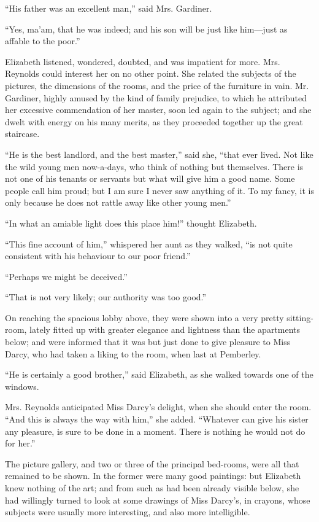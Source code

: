 ``His father was an excellent man,'' said Mrs. Gardiner.

``Yes, ma'am, that he was indeed; and his son will be just like him---just as affable to the poor.''

Elizabeth listened, wondered, doubted, and was impatient for more. Mrs. Reynolds could interest her on no other point. She related the subjects of the pictures, the dimensions of the rooms, and the price of the furniture in vain. Mr. Gardiner, highly amused by the kind of family prejudice, to which he attributed her excessive commendation of her master, soon led again to the subject; and she dwelt with energy on his many merits, as they proceeded together up the great staircase.

``He is the best landlord, and the best master,'' said she, ``that ever lived. Not like the wild young men now-a-days, who think of nothing but themselves. There is not one of his tenants or servants but what will give him a good name. Some people call him proud; but I am sure I never saw anything of it. To my fancy, it is only because he does not rattle away like other young men.''

``In what an amiable light does this place him!'' thought Elizabeth.

``This fine account of him,'' whispered her aunt as they walked, ``is not quite consistent with his behaviour to our poor friend.''

``Perhaps we might be deceived.''

``That is not very likely; our authority was too good.''

On reaching the spacious lobby above, they were shown into a very pretty sitting-room, lately fitted up with greater elegance and lightness than the apartments below; and were informed that it was but just done to give pleasure to Miss Darcy, who had taken a liking to the room, when last at Pemberley.

``He is certainly a good brother,'' said Elizabeth, as she walked towards one of the windows.

Mrs. Reynolds anticipated Miss Darcy's delight, when she should enter the room. ``And this is always the way with him,'' she added. ``Whatever can give his sister any pleasure, is sure to be done in a moment. There is nothing he would not do for her.''

The picture gallery, and two or three of the principal bed-rooms, were all that remained to be shown. In the former were many good paintings: but Elizabeth knew nothing of the art; and from such as had been already visible below, she had willingly turned to look at some drawings of Miss Darcy's, in crayons, whose subjects were usually more interesting, and also more intelligible.

